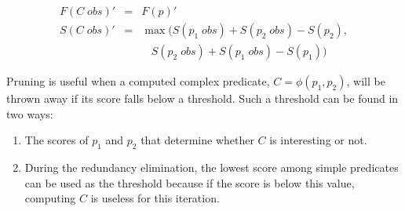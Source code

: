 \begin{eqnarray}
 \nonumber
  F(C\;obs)' &=& F(p)' \\
 \nonumber
  S(C\;obs)' &=&
  \max(S(p_1\;obs)+S(p_2\;obs)-S(p_2),\\
 \nonumber
  & &\ \ \ \ S(p_2\;obs)+S(p_1\;obs)-S(p_1))
\end{eqnarray}

Pruning is useful when a computed complex predicate, $C = \phi(p_1, p_2)$, will be thrown away if its score falls below a threshold.  Such a threshold can be found in two ways:
\begin{enumerate}
\item The scores of $p_1$ and $p_2$ that determine whether $C$ is interesting or not.
\item During the redundancy elimination, the lowest %
score among simple predicates can be used as the threshold because if the score is below this value, computing $C$ is useless for this iteration.
\end{enumerate}
